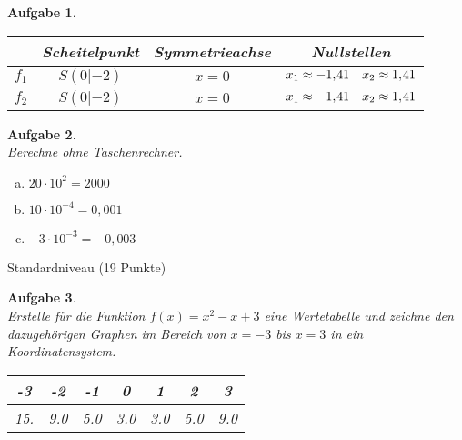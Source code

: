 \documentclass[12pt,fleqn]{article}
\theoremstyle{aufg}
\newtheorem{aufgabe}{Aufgabe}
\theoremstyle{bsp}
\begin{document}
\begin{flushleft}
\begin{aufgabe}
\begin{minipage}{0.25\textwidth}
\end{minipage} 
\begin{minipage}{0.1\textwidth} 
 ~ \end{minipage} 
\begin{minipage}{0.55\textwidth} 
\renewcommand{\arraystretch}{1.3} 
\begin{tabular}{c|c|c|c}
 & Scheitelpunkt & Symmetrieachse & Nullstellen\\ \hline 
$f_1$ & $S(0|-2)$ & $x=0$ & $x_1\approx -1,\hspace{-1pt}41\quad x_2\approx1,\hspace{-1pt}41$\\ \hline 
$f_2$ & $S(0|-2)$ & $x=0$ & $x_1\approx -1,\hspace{-1pt}41\quad x_2\approx1,\hspace{-1pt}41$\\ 

\end{tabular} 

\end{minipage} 

\end{aufgabe} 
\begin{aufgabe} ~ \\ 
Berechne ohne Taschenrechner. \\ 
\begin{multicols}{3} 
\begin{enumerate}[a)] 
\item 
$20\cdot10^{2}=2000$
\item 
$10\cdot10^{-4}=0,001$
\item 
$-3\cdot10^{-3}=-0,003$
\end{enumerate} 
\end{multicols} 
\end{aufgabe} 

 \clearpage 
\begin{center} \begin{framed} Standardniveau (19 Punkte) \end{framed} \end{center}\begin{aufgabe} ~ \\ 
Erstelle f\"ur die Funktion $f(x)=x^{2} - x + 3$ eine Wertetabelle und zeichne den dazugeh\"origen Graphen im Bereich von $x=-3$ bis $x=3$ in ein Koordinatensystem. \\ 
\renewcommand{\arraystretch}{1.0} 
\begin{tabular}{c|c|c|c|c|c|c}
-3 & -2 & -1 & 0 & 1 & 2 & 3\\ \hline 
15. & 9.0 & 5.0 & 3.0 & 3.0 & 5.0 & 9.0\\ 


\end{tabular}
\end{aufgabe}
\end{flushleft}
\end{document}
